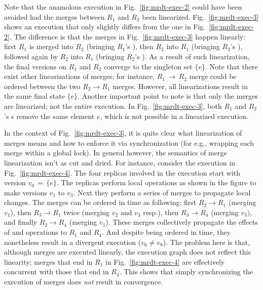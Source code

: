 Note that the anamolous execution in Fig.~\ref{fig:mrdt-exec-2} could
have been avoided had the merges between $R_1$ and $R_2$ been
linearized. Fig.~\ref{fig:mrdt-exec-3} shows an execution that only
slightly differs from the one in Fig.~\ref{fig:mrdt-exec-2}. The
difference is that the merges in Fig.~\ref{fig:mrdt-exec-3} happen
linearly: first $R_1$ is merged into $R_2$ (bringing $R_1$'s
), then $R_2$ into $R_1$ (bringing $R_2$'s ),
followed again by $R_2$ into $R_1$ (bringing $R_2$'s ). As a
result of such linearization, the final versions on $R_1$ and $R_2$
converge to the singleton set $\{e\}$. Note that there exist other
linearizations of merges; for instance, $R_1 \,\rightarrow\, R_2$
merge could be ordered between the two $R_2 \rightarrow R_1$ merges.
However, all linearizations result in the same final state $\{e\}$.
Another important point to note is that only the merges are
linearized; not the entire execution. In Fig.~\ref{fig:mrdt-exec-3},
both $R_1$ and $R_2$'s s remove the same element $e$, which
is not possible in a linearized execution. %

In the context of Fig.~\ref{fig:mrdt-exec-3}, it is quite clear what
linearization of merges means and how to enforce it via
synchronization (for e.g., wrapping each merge within a global lock).
In general however, the semantics of merge linearization isn't as cut
and dried. For instance, consider the execution in
Fig.~\ref{fig:mrdt-exec-4}. The four replicas involved in the
execution start with version $v_0 \,=\, \{e\}$. The replicas perform
local operations as shown in the figure to make versions $v_1$ to
$v_3$. Next they perform a series of merges to propagate local
changes. The merges can be ordered in time as following: first $R_2
\rightarrow R_1$ (merging $v_1$), then $R_3 \rightarrow R_1$ twice
(merging $v_2$ and $v_3$ resp.), then $R_3 \rightarrow R_4$ (merging
$v_3)$, and finally $R_2 \rightarrow R_4$ (merging $v_1$). These
merges collectively propagate the effects of  and 
operations to $R_1$ and $R_4$. And despite being ordered in time,
they nonetheless result in a divergent execution ($v_6 \neq v_8$). The
problem here is that, although merges are executed linearly, the
execution graph does not reflect this linearity; merges that end in
$R_1$ in Fig.~\ref{fig:mrdt-exec-4} are effectively concurrent with
those that end in $R_4$. This shows that simply synchronizing the
execution of merges does \emph{not} result in convergence.

